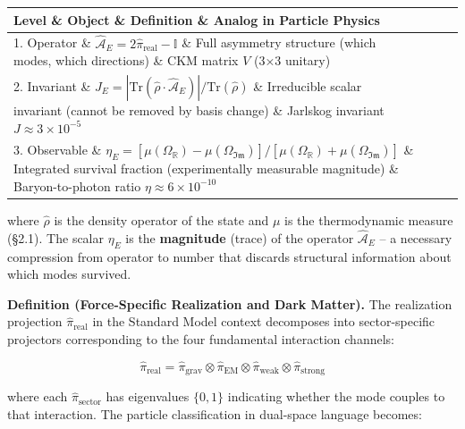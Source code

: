 \documentclass[11pt,a4paper]{article}
\theoremstyle{definition}\newtheorem{definition}{Definition}
\theoremstyle{remark}\newtheorem{remark}{Remark}
\begin{document}
\begin{longtable}{llll}
\hline
Level \& Object \& Definition \& Analog in Particle Physics \\
\hline
1. Operator \& $\hat{\mathcal{A}}_E = 2\hat{\pi}_{\text{real}} - \mathbb{I}$ \& Full asymmetry structure (which modes, which directions) \& CKM matrix $V$ (3×3 unitary) \\
2. Invariant \& $J_E = |\text{Tr}(\hat{\rho} \cdot \hat{\mathcal{A}}_E)| / \text{Tr}(\hat{\rho})$ \& Irreducible scalar invariant (cannot be removed by basis change) \& Jarlskog invariant $J \approx 3 \times 10^{-5}$ \\
3. Observable \& $\eta_E = [\mu(\Omega_{\mathbb{R}}) - \mu(\Omega_{\mathfrak{Im}})] / [\mu(\Omega_{\mathbb{R}}) + \mu(\Omega_{\mathfrak{Im}})]$ \& Integrated survival fraction (experimentally measurable magnitude) \& Baryon-to-photon ratio $\eta \approx 6 \times 10^{-10}$ \\
\hline
\end{longtable}
where $\hat{\rho}$ is the density operator of the state and $\mu$ is the thermodynamic measure (\S 2.1). The scalar $\eta_E$ is the \textbf{magnitude} (trace) of the operator $\hat{\mathcal{A}}_E$ -- a necessary compression from operator to number that discards structural information about which modes survived.

\textbf{Definition (Force-Specific Realization and Dark Matter).} The realization projection $\hat{\pi}_{\text{real}}$ in the Standard Model context decomposes into sector-specific projectors corresponding to the four fundamental interaction channels:


\begin{equation}
\hat{\pi}_{\text{real}} = \hat{\pi}_{\text{grav}} \otimes \hat{\pi}_{\text{EM}} \otimes \hat{\pi}_{\text{weak}} \otimes \hat{\pi}_{\text{strong}}
\end{equation}


where each $\hat{\pi}_{\text{sector}}$ has eigenvalues $\{0, 1\}$ indicating whether the mode couples to that interaction. The particle classification in dual-space language becomes:
\end{document}
